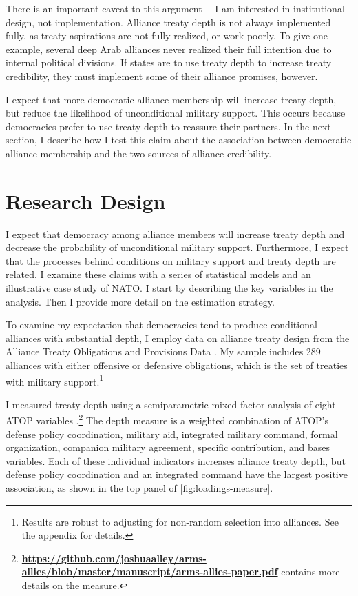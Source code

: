\documentclass[12pt]{article}
\begin{document}
There is an important caveat to this argument--- I am interested in institutional design, not implementation.
Alliance treaty depth is not always implemented fully, as treaty aspirations are not fully realized, or work poorly. 
To give one example, several deep Arab alliances never realized their full intention due to internal political divisions.  
If states are to use treaty depth to increase treaty credibility, they must implement some of their alliance promises, however. 


I expect that more democratic alliance membership will increase treaty depth, but reduce the likelihood of unconditional military support.  
This occurs because democracies prefer to use treaty depth to reassure their partners. 
In the next section, I describe how I test this claim about the association between democratic alliance membership and the two sources of alliance credibility. 



\section{Research Design}

 
I expect that democracy among alliance members will increase treaty depth and decrease the probability of unconditional military support. 
Furthermore, I expect that the processes behind conditions on military support and treaty depth are related. 
I examine these claims with a series of statistical models and an illustrative case study of NATO. 
I start by describing the key variables in the analysis. 
Then I provide more detail on the estimation strategy. 


To examine my expectation that democracies tend to produce conditional alliances with substantial depth, I employ data on alliance treaty design from the Alliance Treaty Obligations and Provisions Data \citep{Leedsetal2002}. 
My sample includes 289 alliances with either offensive or defensive obligations, which is the set of treaties with military support.\footnote{Results are robust to adjusting for non-random selection into alliances. See the appendix for details.} 


I measured treaty depth using a semiparametric mixed factor analysis of eight ATOP variables \citep{Murrayetal2013}.\footnote{\textbf{\url{https://github.com/joshuaalley/arms-allies/blob/master/manuscript/arms-allies-paper.pdf}} contains more details on the measure.}
The depth measure is a weighted combination of ATOP's defense policy coordination, military aid, integrated military command, formal organization, companion military agreement, specific contribution, and bases variables. 
Each of these individual indicators increases alliance treaty depth, but defense policy coordination and an integrated command have the largest positive association, as shown in the top panel of \autoref{fig:loadings-measure}. 
\end{document}
